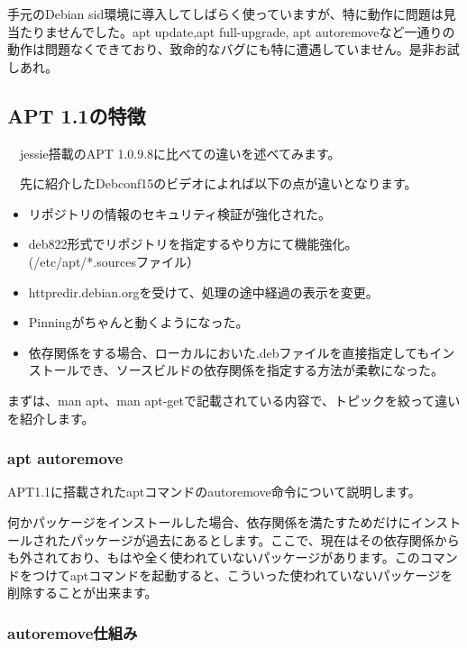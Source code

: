\documentclass[mingoth,a4paper]{jsarticle}
\begin{document}
 手元のDebian sid環境に導入してしばらく使っていますが、特に動作に問題は見当たりませんでした。apt update,apt full-upgrade, apt autoremoveなど一通りの動作は問題なくできており、致命的なバグにも特に遭遇していません。是非お試しあれ。

\subsection{APT 1.1の特徴}

　jessie搭載のAPT 1.0.9.8に比べての違いを述べてみます。

　先に紹介したDebconf15のビデオによれば以下の点が違いとなります。

\begin{itemize}
\item リポジトリの情報のセキュリティ検証が強化された。
\item deb822形式でリポジトリを指定するやり方にて機能強化。(/etc/apt/*.sourcesファイル）
\item httpredir.debian.orgを受けて、処理の途中経過の表示を変更。
\item Pinningがちゃんと動くようになった。
\item 依存関係をする場合、ローカルにおいた.debファイルを直接指定してもインストールでき、ソースビルドの依存関係を指定する方法が柔軟になった。
\end{itemize}

 まずは、man apt、man apt-getで記載されている内容で、トピックを絞って違いを紹介します。

\subsubsection{apt autoremove}

 APT1.1に搭載されたaptコマンドのautoremove命令について説明します。

 何かパッケージをインストールした場合、依存関係を満たすためだけにインストールされたパッケージが過去にあるとします。ここで、現在はその依存関係からも外されており、もはや全く使われていないパッケージがあります。このコマンドをつけてaptコマンドを起動すると、こういった使われていないパッケージを削除することが出来ます。


\subsubsection{autoremove仕組み}
\end{document}
